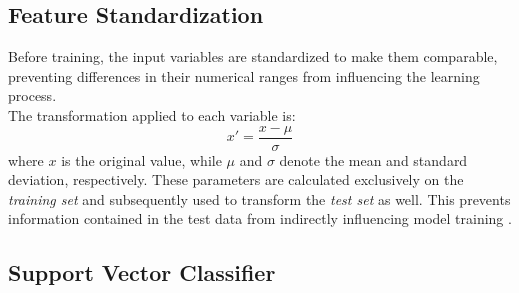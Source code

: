 \subsection{Feature Standardization}
\label{subsec:standardizzazione-variabili}
Before training, the input variables are standardized to make them comparable, preventing differences in their numerical ranges from influencing the learning process.\\ The transformation applied to each variable is:
\begin{equation}
	x' = \frac{x-\mu}{\sigma}
	\label{eq:standardizzazione}
\end{equation}
where $x$ is the original value, while $\mu$ and $\sigma$ denote the mean and standard deviation, respectively. These parameters are calculated exclusively on the \emph{training set} and subsequently used to transform the \emph{test set} as well. This prevents information contained in the test data from indirectly influencing model training \cite{kaufman2012leakage}.
\subsection{Support Vector Classifier}
\label{subsec:svc}
